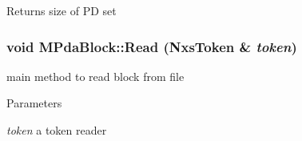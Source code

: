 \label{classMPdaBlock_a551b1f35390ddf325216d2a70f8adb3f}
\begin{DoxyReturn}{Returns}
size of PD set 
\end{DoxyReturn}
\hypertarget{classMPdaBlock_a80e0ffd8121c77ad6ee49810cd58b1bf}{
\subsubsection[{Read}]{\setlength{\rightskip}{0pt plus 5cm}void MPdaBlock::Read ({\bf NxsToken} \& {\em token})}}
\label{classMPdaBlock_a80e0ffd8121c77ad6ee49810cd58b1bf}
main method to read block from file 
\begin{DoxyParams}{Parameters}
\item[{\em token}]a token reader \end{DoxyParams}


